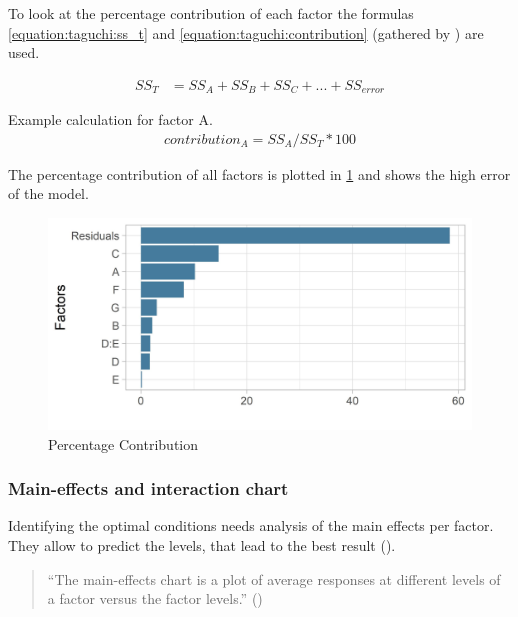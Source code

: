 To look at the percentage contribution of each factor the formulas \ref{equation:taguchi:ss_t} and \ref{equation:taguchi:contribution} (gathered by \cite{yang_design_2009}) are used.

\begin{equation} \label{equation:taguchi:ss_t}
	\begin{split}
		SS_T & = SS_A + SS_B + SS_C + ... + SS_{error}
	\end{split}
\end{equation}

Example calculation for factor A.
\begin{equation} \label{equation:taguchi:contribution}
	\begin{split}
		contribution_A = SS_A / SS_T * 100
	\end{split}
\end{equation}

The percentage contribution of all factors is plotted in \ref{figure:taguchi:percentage_contribution} and shows the high error of the model. 
\begin{figure}[ht] 
	\label{figure:taguchi:percentage_contribution}
	\includegraphics[width=1\linewidth]{simulations/taguchi/plots/percentage_contribution}
	\caption{Percentage Contribution}
\end{figure}


\subsubsection{Main-effects and interaction chart}
Identifying the optimal conditions needs analysis of the main effects per factor. They allow to predict the levels, that lead to the best result (\cite{roy_primer_1990}).

\begin{quote}
	\begin{em}
		\enquote{The main-effects chart is a plot of average responses at different levels of a factor versus the factor levels.} (\cite{yang_design_2009})
	\end{em}
\end{quote}

